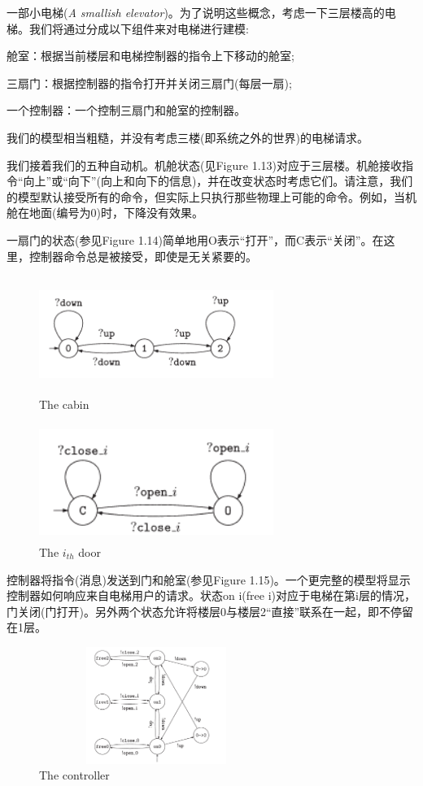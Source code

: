 \documentclass{book}
\begin{document}
    一部小电梯({\itshape A smallish elevator})。为了说明这些概念，考虑一下三层楼高的电梯。我们将通过分成以下组件来对电梯进行建模:
    
    舱室：根据当前楼层和电梯控制器的指令上下移动的舱室;

    三扇门：根据控制器的指令打开并关闭三扇门(每层一扇);

    一个控制器：一个控制三扇门和舱室的控制器。

    我们的模型相当粗糙，并没有考虑三楼(即系统之外的世界)的电梯请求。

    我们接着我们的五种自动机。机舱状态(见Figure 1.13)对应于三层楼。机舱接收指令“向上”或“向下”(向上和向下的信息)，并在改变状态时考虑它们。请注意，我们的模型默认接受所有的命令，但实际上只执行那些物理上可能的命令。例如，当机舱在地面(编号为0)时，下降没有效果。
    
    一扇门的状态(参见Figure 1.14)简单地用O表示“打开”，而C表示“关闭”。在这里，控制器命令总是被接受，即使是无关紧要的。
    \begin{figure}
    \centering
    \includegraphics[height=1.5in,width=3.0in]{1_13.png}
    \caption{The cabin}
    \end{figure}
    \begin{figure}
    \centering
    \includegraphics[height=1.5in,width=3.0in]{1_14.png}
    \caption{The $i_{th}$ door}
    \end{figure}
    
    控制器将指令(消息)发送到门和舱室(参见Figure 1.15)。一个更完整的模型将显示控制器如何响应来自电梯用户的请求。状态on i(free i)对应于电梯在第i层的情况，门关闭(门打开)。另外两个状态允许将楼层0与楼层2“直接”联系在一起，即不停留在1层。
    \begin{figure}
    \centering
    \includegraphics[height=1.5in,width=3.0in]{1_15.png}
    \caption{The controller}
    \end{figure}
\end{document}
